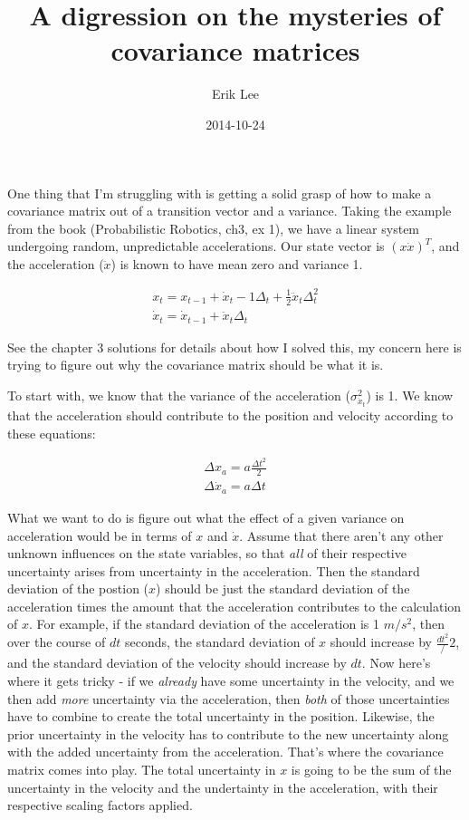 \documentclass{article}
\author{Erik Lee}
\date{2014-10-24}
\title{A digression on the mysteries of covariance matrices}
\begin{document}
\maketitle

One thing that I'm struggling with is getting a solid grasp of how to make a
covariance matrix out of a transition vector and a variance. Taking the example
from the book (Probabilistic Robotics, ch3, ex 1), we have a linear system
undergoing random, unpredictable accelerations. Our state vector is
$\left(x \dot{x}\right)^T$, and the acceleration ($\ddot{x}$) is known to have
mean zero and variance 1.

\begin{gather}
  x_t = x_{t-1} + \dot{x}_t-1\Delta_t + \frac{1}{2}\ddot{x}_t\Delta_t^2 \\
  \dot{x}_t = \dot{x}_{t-1} + \ddot{x}_t\Delta_t 
\end{gather}

See the chapter 3 solutions for details about how I solved this, my concern
here is trying to figure out why the covariance matrix should be what it is.

To start with, we know that the variance of the acceleration
($\sigma_{\ddot{x}_t}^2$) is 1. We know that the acceleration should contribute
to the position and velocity according to these equations:

\begin{gather}
  \Delta x_a = a \frac{\Delta t^2}{2} \\
  \Delta \dot{x}_a = a \Delta t 
\end{gather}

What we want to do is figure out what the effect of a given variance on
acceleration would be in terms of $x$ and $\dot{x}$. Assume that there aren't
any other unknown influences on the state variables, so that \textit{all} of
their respective uncertainty arises from uncertainty in the acceleration. Then
the standard deviation of the postion ($x$) should be just the standard
deviation of the acceleration times the amount that the acceleration contributes
to the calculation of $x$. For example, if the standard deviation of the
acceleration is 1 $m/s^2$, then over the course of $dt$ seconds, the standard
deviation of $x$ should increase by $\frac{dt^2}/{2}$, and the standard
deviation of the velocity should increase by $dt$. Now here's where it gets
tricky - if we \textit{already} have some uncertainty in the velocity, and we
then add \textit{more} uncertainty via the acceleration, then \textit{both} of
those uncertainties have to combine to create the total uncertainty in the
position. Likewise, the prior uncertainty in the velocity has to contribute to
the new uncertainty along with the added uncertainty from the acceleration.
That's where the covariance matrix comes into play. The total uncertainty in $x$
is going to be the sum of the uncertainty in the velocity and the undertainty in
the acceleration, with their respective scaling factors applied.
\end{document}
